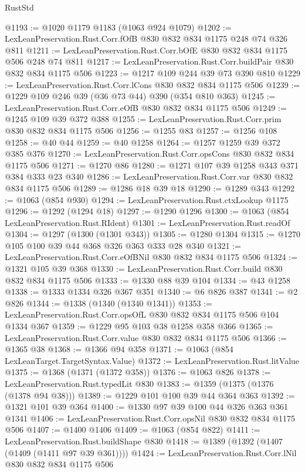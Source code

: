 \begin{lexlean}{RustStd}
\begin{coremodule}
@1193 := @1020 @1179 @1183 (@1063 @924 @1079)
@1202 := LexLeanPreservation.Rust.Corr.fOfB @830 @832 @834 @1175 @248 @74 @326 @811
@1211 := LexLeanPreservation.Rust.Corr.bOfE @830 @832 @834 @1175 @506 @248 @74 @811
@1217 := LexLeanPreservation.Rust.Corr.buildPair @830 @832 @834 @1175 @506
@1223 := @1217 @109 @244 @39 @73 @390 @810
@1229 := LexLeanPreservation.Rust.Corr.lCons @830 @832 @834 @1175 @506
@1239 := @1229 @109 @246 @39 (@36 @73 @44) @390 (@354 @810 @363)
@1245 := LexLeanPreservation.Rust.Corr.eOfB @830 @832 @834 @1175 @506
@1249 := @1245 @109 @39 @372 @388
@1255 := LexLeanPreservation.Rust.Corr.prim @830 @832 @834 @1175 @506
@1256 := @1255 @83
@1257 := @1256 @108
@1258 := @40 @44
@1259 := @40 @1258
@1264 := @1257 @1259 @39 @372 @385 @376
@1270 := LexLeanPreservation.Rust.Corr.opsCons @830 @832 @834 @1175 @506
@1271 := @1270 @86
@1280 := @1271 @107 @39 @1258 @343 @371 @384 @333 @23 @340
@1286 := LexLeanPreservation.Rust.Corr.var @830 @832 @834 @1175 @506
@1289 := @1286 @18 @39 @18
@1290 := @1289 @343
@1292 := @1063 (@854 @930)
@1294 := LexLeanPreservation.Rust.ctxLookup @1175
@1296 := @1292 (@1294 @18)
@1297 := @1290 @1296
@1300 := @1063 (@854 LexLeanPreservation.Rust.RIdent)
@1301 := LexLeanPreservation.Rust.readOf
@1304 := @1297 (@1300 (@1301 @343))
@1305 := @1280 @1304
@1315 := @1270 @105 @100 @39 @44 @368 @326 @363 @333 @28 @340
@1321 := LexLeanPreservation.Rust.Corr.eOfBNil @830 @832 @834 @1175 @506
@1324 := @1321 @105 @39 @368
@1330 := LexLeanPreservation.Rust.Corr.build @830 @832 @834 @1175 @506
@1333 := @1330 @88 @39 @104
@1334 := @43 @1258
@1338 := @1333 @1334 @326 @367 @351
@1340 := @6 @826 @387
@1341 := @2 @826
@1344 := @1338 (@1340 (@1340 @1341))
@1353 := LexLeanPreservation.Rust.Corr.opsOfL @830 @832 @834 @1175 @506 @104 @1334 @367
@1359 := @1229 @95 @103 @38 @1258 @358 @366
@1365 := LexLeanPreservation.Rust.Corr.value @830 @832 @834 @1175 @506
@1366 := @1365 @38
@1368 := @1366 @94 @358
@1371 := @1063 (@854 LexLeanTarget.TargetSyntax.Value)
@1372 := LexLeanPreservation.Rust.litValue
@1375 := @1368 (@1371 (@1372 @358))
@1376 := @1063 @826
@1378 := LexLeanPreservation.Rust.typedLit @830
@1383 := @1359 (@1375 (@1376 (@1378 @94 @38)))
@1389 := @1229 @101 @100 @39 @44 @364 @363
@1392 := @1321 @101 @39 @364
@1400 := @1330 @97 @39 @100 @44 @326 @363 @361 @1341
@1406 := LexLeanPreservation.Rust.Corr.opsNil @830 @832 @834 @1175 @506
@1407 := @1400 @1406
@1409 := @1063 (@854 @822)
@1411 := LexLeanPreservation.Rust.buildShape @830
@1418 := @1389 (@1392 (@1407 (@1409 (@1411 @97 @39 @361))))
@1424 := LexLeanPreservation.Rust.Corr.lNil @830 @832 @834 @1175 @506

\end{coremodule}
\end{lexlean}

